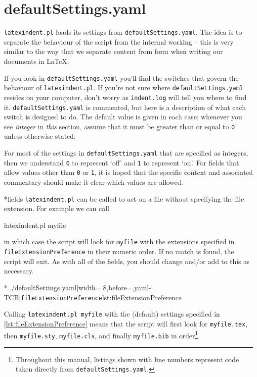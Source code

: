 \section{defaultSettings.yaml}\label{sec:defuseloc}
 \texttt{latexindent.pl} loads its settings from \texttt{defaultSettings.yaml}. The idea
 is to separate the behaviour of the script from the internal working -- this is very
 similar to the way that we separate content from form when writing our documents in
 \LaTeX.

 If you look in \texttt{defaultSettings.yaml} you'll find the switches that govern the
 behaviour of \texttt{latexindent.pl}. If you're not sure where
 \texttt{defaultSettings.yaml} resides on your computer, don't worry as
 \texttt{indent.log} will tell you where to find it. \texttt{defaultSettings.yaml} is
 commented, but here is a description of what each switch is designed to do. The default
 value is given in each case; whenever you see \emph{integer} in \emph{this} section,
 assume that it must be greater than or equal to \texttt{0} unless otherwise stated.

 For most of the settings in \texttt{defaultSettings.yaml} that are specified as integers,
 then we understand \texttt{0} to represent `off' and \texttt{1} to represent `on'. For
 fields that allow values other than \texttt{0} or \texttt{1}, it is hoped that the
 specific context and associated commentary should make it clear which values are allowed.

*{fields}
	\texttt{latexindent.pl} can be called to
	act on a file without specifying the file extension. For example we can call
	\begin{commandshell}
latexindent.pl myfile
\end{commandshell}
	in which case the script will look for \texttt{myfile} with the extensions specified in
	\texttt{fileExtensionPreference} in their numeric order. If no match is found, the script
	will exit. As with all of the fields, you should change and/or add to this as necessary.

	\cmhlistingsfromfile[style=fileExtensionPreference]*{../defaultSettings.yaml}[width=.8\linewidth,before=\centering,yaml-TCB]{\texttt{fileExtensionPreference}}{lst:fileExtensionPreference}

	Calling \texttt{latexindent.pl myfile} with the (default) settings specified in
	\cref{lst:fileExtensionPreference} means that the script will first look for
	\texttt{myfile.tex}, then \texttt{myfile.sty}, \texttt{myfile.cls}, and finally
	\texttt{myfile.bib} in order\footnote{Throughout this manual, listings shown with line
		numbers represent code taken directly from \texttt{defaultSettings.yaml}.}.

